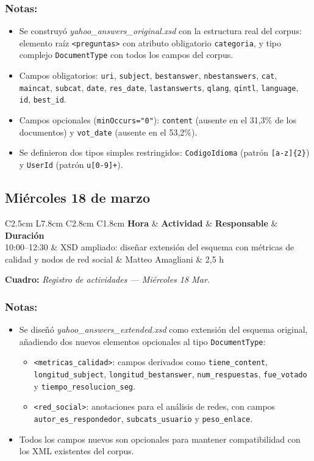 \documentclass[11pt,a4paper]{article}
\newcommand{\notetitle}[1]{\subsubsection*{#1}}
\newcommand{\activitytable}[2]{%
  \begin{center}
  \begin{tabular}{C{2.5cm} L{7.8cm} C{2.8cm} C{1.8cm}}
  \toprule
  \rowcolor{white}
  \textbf{Hora} & \textbf{Actividad} & \textbf{Responsable} & \textbf{Duración} \\
  \midrule
  #1
  \bottomrule
  \end{tabular}
  \end{center}
  \vspace{-4pt}
  {\small\textbf{Cuadro:} \textit{#2}}
  \vspace{6pt}
}
\begin{document}
\notetitle{Notas:}
\begin{itemize}
  \item Se construyó \textit{yahoo\_answers\_original.xsd} con la estructura real del corpus: elemento raíz \texttt{<preguntas>} con atributo obligatorio \texttt{categoria}, y tipo complejo \texttt{DocumentType} con todos los campos del corpus.
  \item Campos obligatorios: \texttt{uri}, \texttt{subject}, \texttt{bestanswer}, \texttt{nbestanswers}, \texttt{cat}, \texttt{maincat}, \texttt{subcat}, \texttt{date}, \texttt{res\_date}, \texttt{lastanswerts}, \texttt{qlang}, \texttt{qintl}, \texttt{language}, \texttt{id}, \texttt{best\_id}.
  \item Campos opcionales (\texttt{minOccurs="0"}): \texttt{content} (ausente en el 31,3\% de los documentos) y \texttt{vot\_date} (ausente en el 53,2\%).
  \item Se definieron dos tipos simples restringidos: \texttt{CodigoIdioma} (patrón \texttt{[a-z]\{2\}}) y \texttt{UserId} (patrón \texttt{u[0-9]+}).
\end{itemize}

\subsection{Miércoles 18 de marzo}

\activitytable{%
  10:00--12:30 & XSD ampliado: diseñar extensión del esquema con métricas de calidad y nodos de red social & Matteo Amagliani & 2,5 h \\
}{Registro de actividades --- Miércoles 18 Mar.}

\notetitle{Notas:}
\begin{itemize}
  \item Se diseñó \textit{yahoo\_answers\_extended.xsd} como extensión del esquema original, añadiendo dos nuevos elementos opcionales al tipo \texttt{DocumentType}:
  \begin{itemize}
    \item \texttt{<metricas\_calidad>}: campos derivados como \texttt{tiene\_content}, \texttt{longitud\_subject}, \texttt{longitud\_bestanswer}, \texttt{num\_respuestas}, \texttt{fue\_votado} y \texttt{tiempo\_resolucion\_seg}.
    \item \texttt{<red\_social>}: anotaciones para el análisis de redes, con campos \texttt{autor\_es\_respondedor}, \texttt{subcats\_usuario} y \texttt{peso\_enlace}.
  \end{itemize}
  \item Todos los campos nuevos son opcionales para mantener compatibilidad con los XML existentes del corpus.
\end{itemize}
\end{document}
